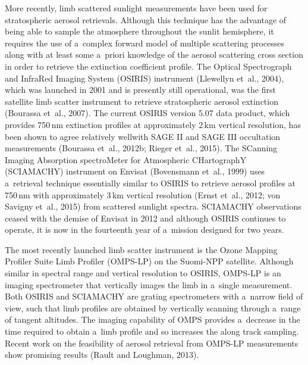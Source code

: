 \documentclass[amtd, online, hvmath]{copernicus}
\providecommand{\DIFadd}[1]{{\protect\color{blue}\uwave{#1}}} %
\providecommand{\DIFaddbegin}{} %
\providecommand{\DIFaddend}{} %
\begin{document}
More recently, limb scattered sunlight measurements have been used for
stratospheric aerosol retrievals. Although this technique has the
advantage of being able to sample the atmosphere throughout the sunlit
hemisphere, it requires the use of a~complex forward model of multiple
scattering processes along with at least some a~priori knowledge of
the aerosol scattering cross section in order to retrieve the
extinction coefficient profile. The Optical Spectrograph and InfraRed
Imaging System (OSIRIS) instrument (Llewellyn et~al., 2004), which was
launched in 2001 and is presently still operational, was the first
satellite limb scatter instrument to retrieve stratospheric aerosol
extinction (Bourassa et~al., 2007). The current OSIRIS version 5.07
data product, which provides 750\,\unit{nm} extinction profiles at
approximately 2\,\unit{km} vertical resolution, has been shown to
agree relatively well\DIFaddbegin \DIFadd{, generally within 15\%, }\DIFaddend with SAGE II and SAGE III occultation
measurements  (Bourassa et~al., 2012b; Rieger et~al., 2015). The
SCanning Imaging Absorption spectroMeter for Atmospheric CHartographY
(SCIAMACHY) instrument on Envisat (Bovensmann et~al., 1999) uses
a~retrieval technique essentially similar to OSIRIS to retrieve
aerosol profiles at 750\,\unit{nm} with approximately 3\,\unit{km}
vertical resolution (\DIFaddbegin \DIFadd{Taha et al., 2011; }\DIFaddend Ernst et~al., 2012; von Savigny et~al., 2015)
from scattered sunlight spectra.  SCIAMACHY observations ceased with
the demise of Envisat in 2012 and although OSIRIS continues to
operate, it is now in the fourteenth year of a~mission designed for
two years.

The most recently launched limb scatter instrument is the Ozone
Mapping Profiler Suite Limb Profiler (OMPS-LP) on the Suomi-NPP
satellite. Although similar in spectral range and vertical resolution
to OSIRIS, OMPS-LP is an imaging spectrometer that vertically images
the limb in a~single measurement. Both OSIRIS and SCIAMACHY are
grating spectrometers with a~narrow field of view, such that limb
profiles are obtained by vertically scanning through a~range of
tangent altitudes. The imaging capability of OMPS provides a~decrease
in the time required to obtain a~limb profile and so increases the
along track sampling. Recent work on the feasibility of aerosol
retrieval from OMPS-LP measurements show promising results (Rault and
Loughman, 2013).
\end{document}
